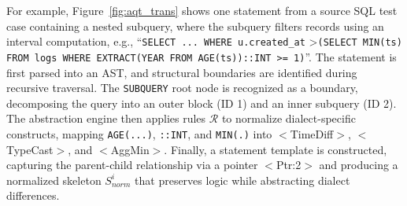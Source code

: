 \documentclass[conference]{IEEEtran}
\begin{document}
For example, Figure~\ref{fig:aqt_trans} shows one statement from a source SQL test case containing a nested subquery, where the subquery filters records using an interval computation, e.g., ``\texttt{SELECT ... WHERE u.created\_at} \textgreater \texttt{(SELECT MIN(ts) FROM logs WHERE EXTRACT(YEAR FROM AGE(ts))::INT >= 1)}''.
The statement is first parsed into an AST, and structural boundaries are identified during recursive traversal. 
The \texttt{SUBQUERY} root node is recognized as a boundary, decomposing the query into an outer block (ID 1) and an inner subquery (ID 2).
The abstraction engine then applies rules $\mathcal{R}$ to normalize dialect-specific constructs, mapping \texttt{AGE(...)}, \texttt{::INT}, and \texttt{MIN(.)} into $<$TimeDiff$>$, $<$TypeCast$>$, and $<$AggMin$>$.
Finally, a statement template is constructed, capturing the parent-child relationship via a pointer $<$Ptr:2$>$ and producing a normalized skeleton $S^i_{norm}$ that preserves logic while abstracting dialect differences.
\end{document}
